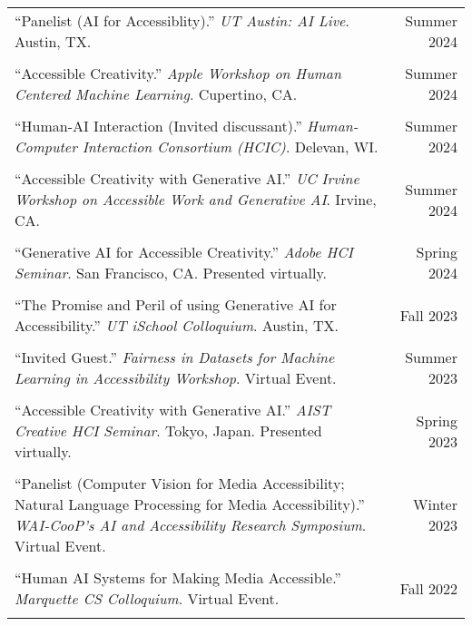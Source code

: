 \begin{longtable}{Xr}
	``Panelist (AI for Accessiblity).'' \textit{UT Austin: AI Live}. Austin, TX. & Summer 2024 \\
	\\

	``Accessible Creativity.'' \textit{Apple Workshop on Human Centered Machine Learning}. Cupertino, CA. & Summer 2024 \\
	\\

	``Human-AI Interaction (Invited discussant).'' \textit{Human-Computer Interaction Consortium (HCIC)}. Delevan, WI. & Summer 2024 \\
	\\

	``Accessible Creativity with Generative AI.'' \textit{UC Irvine Workshop on Accessible Work and Generative AI}. Irvine, CA. & Summer 2024 \\
	\\

	``Generative AI for Accessible Creativity.'' \textit{Adobe HCI Seminar}. San Francisco, CA. Presented virtually. & Spring 2024 \\
	\\

	``The Promise and Peril of using Generative AI for Accessibility.'' \textit{UT iSchool Colloquium}. Austin, TX. & Fall 2023 \\
	\\

	``Invited Guest.'' \textit{Fairness in Datasets for Machine Learning in Accessibility Workshop}. Virtual Event. & Summer 2023 \\
	\\

	``Accessible Creativity with Generative AI.'' \textit{AIST Creative HCI Seminar}. Tokyo, Japan. Presented virtually. & Spring 2023 \\
	\\

	``Panelist (Computer Vision for Media Accessibility; Natural Language Processing for Media Accessibility).'' \textit{WAI-CooP’s AI and Accessibility Research Symposium}. Virtual Event. & Winter 2023 \\
	\\

	``Human AI Systems for Making Media Accessible.'' \textit{Marquette CS Colloquium}. Virtual Event. & Fall 2022 \\
	\\


\end{longtable}
